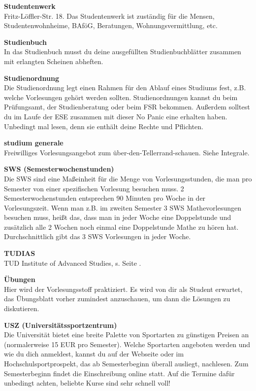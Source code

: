 \textbf{Studentenwerk} \\
Fritz-Löffler-Str. 18.
Das Studentenwerk ist zuständig für die Mensen, Studentenwohnheime, BAföG, Beratungen, Wohnungsvermittlung, etc.

\textbf{Studienbuch} \\
In das Studienbuch musst du deine ausgefüllten Studienbuchblätter zusammen mit erlangten Scheinen abheften.

\textbf{Studienordnung} \\
Die Studienordnung legt einen Rahmen für den Ablauf eines Studiums fest, z.B. welche Vorlesungen gehört werden sollten.
Studienordnungen kannst du beim Prüfungsamt, der Studienberatung oder beim FSR bekommen.
Außerdem solltest du im Laufe der ESE zusammen mit dieser No Panic eine erhalten haben.
Unbedingt mal lesen, denn sie enthält deine Rechte und Pflichten.

\textbf{studium generale} \\
Freiwilliges Vorlesungsangebot zum über-den-Tellerrand-schauen.
Siehe Integrale.

\textbf{SWS (Semesterwochenstunden)} \\
Die SWS sind eine Maßeinheit für die Menge von Vorlesungsstunden, die man pro Semester von einer spezifischen Vorlesung besuchen muss.
2 Semesterwochenstunden entsprechen 90 Minuten pro Woche in der Vorlesungszeit.
Wenn man z.B. im zweiten Semester 3 SWS Mathevorlesungen besuchen muss, heißt das, dass man in jeder Woche eine Doppelstunde und zusätzlich alle 2 Wochen noch einmal eine Doppelstunde Mathe zu hören hat.
Durchschnittlich gibt das 3 SWS Vorlesungen in jeder Woche.

\textbf{TUDIAS} \\
TUD Institute of Advanced Studies, s. Seite \pageref{sec:sprachausbildung}.

\textbf{Übungen} \\
Hier wird der Vorlesungsstoff praktiziert.
Es wird von dir als Student erwartet, das Übungsblatt vorher zumindest anzuschauen, um dann die Lösungen zu diskutieren.

\textbf{USZ (Universitätssportzentrum)} \\
Die Universität bietet eine breite Palette von Sportarten zu günstigen Preisen an (normalerweise 15 EUR pro Semester).
Welche Sportarten angeboten werden und wie du dich anmeldest, kannst du auf der Webseite oder im Hochschulsportprospekt, das ab Semesterbeginn überall ausliegt, nachlesen.
Zum Semesterbeginn findet die Einschreibung online statt.
Auf die Termine dafür unbedingt achten, beliebte Kurse sind sehr schnell voll!

